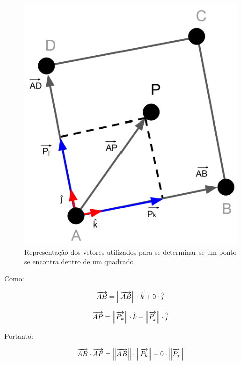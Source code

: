 \begin{alineas}[leftmargin=0pt, itemindent=20pt, labelwidth=15pt, labelsep=5pt, listparindent=1.25cm, align=left]
    \begin{figure}[!htb]
        \caption{\label{img:quadrado_vetores} Representação dos vetores utilizados para se determinar se um ponto se encontra dentro de um quadrado}
    	\begin{center}
            \includegraphics[scale=0.55]{img/quadrado_vetores.png}
    	\end{center}
    \end{figure}
    
    Como:
    
    \begin{equation}
        \overrightarrow{AB} = \norm{\overrightarrow{AB}}\cdot \hat{k} + 0 \cdot \hat{j}
    \end{equation}
    
    \begin{equation}
        \overrightarrow{AP} = \norm{\overrightarrow{P_k}} \cdot \hat{k} + \norm{\overrightarrow{P_j}} \cdot \hat{j}
    \end{equation}
    
    Portanto:
    
    \begin{equation}
        \overrightarrow{AB} \cdot \overrightarrow{AP} = \norm{\overrightarrow{AB}} \cdot \norm{\overrightarrow{P_k}} + 0 \cdot \norm{\overrightarrow{P_j}}
    \end{equation}
    

\end{alineas}
